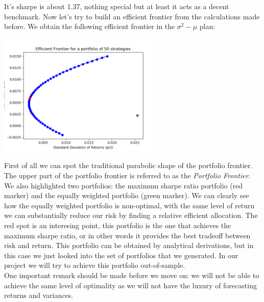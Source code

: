 It's sharpe is about 1.37, nothing special but at least it acts as a decent benchmark. Now let's try to build an efficient frontier from the calculations made before. We obtain the following efficient frontier in the $\sigma^2-\mu$ plan:

\begin{center}
	\centering
	\includegraphics[width=0.6\textwidth]{Portfolio_Theory/Portfolio_Front_Figure_2.png}
	\label{Frontier_frontier}
\end{center}

First of all we can spot the traditional parabolic shape of the portfolio frontier. The upper part of the portfolio frontier is referred to as the \textit{Portfolio Frontier}. We also highlighted two portfolios: the maximum sharpe ratio portfolio (red marker) and the equally weighted portfolio (green marker). We can clearly see how the equally weighted portfolio is non-optimal, with the same level of return we can substantially reduce our risk by finding a relative efficient allocation. The red spot is an interesing point, this portfolio is the one that achieves the maximum sharpe ratio, or in other words it provides the best tradeoff between risk and return. This portfolio can be obtained by analytical derivations, but in this case we just looked into the set of portfolios that we generated. In our project we will try to achieve this portfolio out-of-sample.\\
One important remark should be made before we move on: we will not be able to achieve the same level of optimality as we will not have the luxury of forecasting returns and variances.